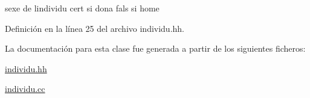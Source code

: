sexe de l\textquotesingle{}individu cert si dona fals si home 



Definición en la línea 25 del archivo individu.\+hh.



La documentación para esta clase fue generada a partir de los siguientes ficheros\+:\begin{DoxyCompactItemize}
\item 
\hyperlink{individu_8hh}{individu.\+hh}\item 
\hyperlink{individu_8cc}{individu.\+cc}\end{DoxyCompactItemize}
